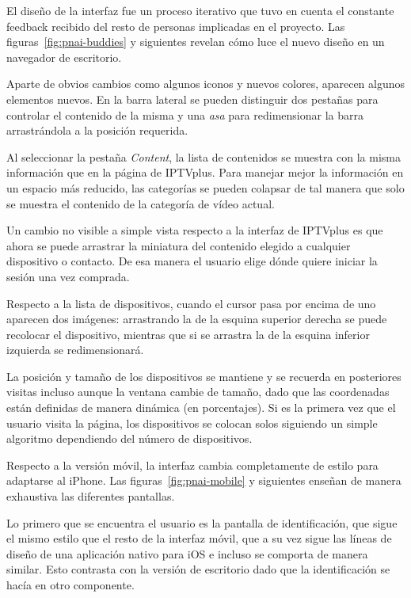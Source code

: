 El diseño de la interfaz fue un proceso iterativo que tuvo en cuenta el constante feedback recibido del resto de personas implicadas en el proyecto.
Las figuras~\ref{fig:pnai-buddies} y siguientes revelan cómo luce el nuevo diseño en un navegador de escritorio.

Aparte de obvios cambios como algunos iconos y nuevos colores, aparecen algunos elementos nuevos.
En la barra lateral se pueden distinguir dos pestañas para controlar el contenido de la misma y una \emph{asa} para redimensionar la barra arrastrándola a la posición requerida.

Al seleccionar la pestaña \emph{Content}, la lista de contenidos se muestra con la misma información que en la página de IPTVplus.
Para manejar mejor la información en un espacio más reducido, las categorías se pueden colapsar de tal manera que solo se muestra el contenido de la categoría de vídeo actual.

Un cambio no visible a simple vista respecto a la interfaz de IPTVplus es que ahora se puede arrastrar la miniatura del contenido elegido a cualquier dispositivo o contacto.
De esa manera el usuario elige dónde quiere iniciar la sesión una vez comprada.

Respecto a la lista de dispositivos, cuando el cursor pasa por encima de uno aparecen dos imágenes: arrastrando la de la esquina superior derecha se puede recolocar el dispositivo, mientras que si se arrastra la de la esquina inferior izquierda se redimensionará.

La posición y tamaño de los dispositivos se mantiene y se recuerda en posteriores visitas incluso aunque la ventana cambie de tamaño, dado que las coordenadas están definidas de manera dinámica (en porcentajes).
Si es la primera vez que el usuario visita la página, los dispositivos se colocan solos siguiendo un simple algoritmo dependiendo del número de dispositivos.

Respecto a la versión móvil, la interfaz cambia completamente de estilo para adaptarse al iPhone.
Las figuras~\ref{fig:pnai-mobile} y siguientes enseñan de manera exhaustiva las diferentes pantallas.

Lo primero que se encuentra el usuario es la pantalla de identificación, que sigue el mismo estilo que el resto de la interfaz móvil, que a su vez sigue las líneas de diseño de una aplicación nativo para iOS e incluso se comporta de manera similar.
Esto contrasta con la versión de escritorio dado que la identificación se hacía en otro componente.

